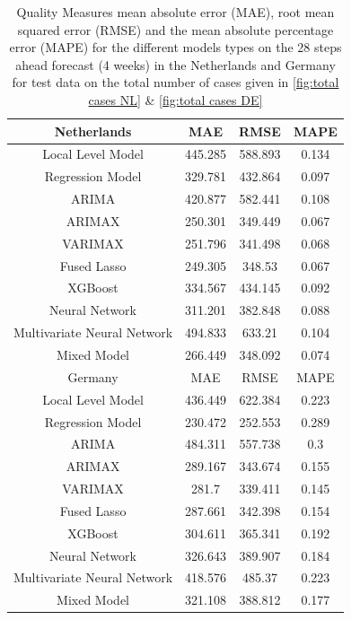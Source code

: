 \begin{table}[]
    \centering
    \begin{tabular}{|c|c c c|}\hline
        Netherlands & MAE & RMSE & MAPE\\\hline
        Local Level Model & 445.285 & 588.893 & 0.134\\
        Regression Model & 329.781 & 432.864 & 0.097\\
        ARIMA & 420.877 & 582.441 & 0.108\\
        ARIMAX & 250.301 & 349.449 & 0.067\\
        VARIMAX & 251.796 & 341.498 & 0.068\\
        Fused Lasso & 249.305 & 348.53 & 0.067\\
        XGBoost & 334.567 & 434.145 & 0.092\\
        Neural Network & 311.201 & 382.848 & 0.088\\
        Multivariate Neural Network & 494.833 & 633.21 & 0.104\\
        Mixed Model & 266.449 & 348.092 & 0.074\\\hline\hline
        Germany & MAE & RMSE & MAPE\\\hline
        Local Level Model & 436.449 & 622.384 & 0.223\\
        Regression Model & 230.472 & 252.553 & 0.289\\
        ARIMA & 484.311 & 557.738 & 0.3\\
        ARIMAX & 289.167 & 343.674 & 0.155\\
        VARIMAX & 281.7 & 339.411 & 0.145\\
        Fused Lasso & 287.661 & 342.398 & 0.154\\
        XGBoost & 304.611 & 365.341 & 0.192\\
        Neural Network & 326.643 & 389.907 & 0.184\\
        Multivariate Neural Network & 418.576 & 485.37 & 0.223\\
        Mixed Model & 321.108 & 388.812 & 0.177\\\hline
    \end{tabular}
    \caption{ Quality Measures mean absolute error (MAE), root mean squared error (RMSE) and the mean absolute percentage error (MAPE) for the different models types on the 28 steps ahead forecast (4 weeks) in the Netherlands and Germany for test data on the total number of cases given in \autoref{fig:total cases NL} \& \ref{fig:total cases DE} }
    \label{tab:4 weeks ahead}
\end{table}

